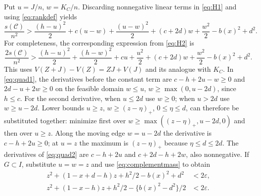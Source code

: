 \documentclass[10pt]{amsart}
\theoremstyle{remark}
\newcommand{\Cset}{\mathcal C}
\begin{document}
Put $u=J/n$, $w=K_C/n$. Discarding nonnegative linear terms in
\eqref{eq:H1} and using \eqref{eq:rankdef} yields
\begin{equation}\label{eq:quad1}
 \frac{s(\Cset)}{n^2}>
 \frac{(h-u)^2}{2}+c(u-w)+\frac{(u-w)^2}{2}
 +(c+2d)w+\frac{w^2}{2}-b(x)^2+d^2.
\end{equation}
For completeness, the corresponding expression from \eqref{eq:H2} is
\begin{equation}\label{eq:quad2}
 \frac{2s(\Cset)}{n^2}>
 \frac{(h-u)^2}{2}+\frac{(h-w)^2}{2}+cu+\frac{u^2}{2}
 +(c+2d)w+\frac{w^2}{2}-b(x)^2+d^2.
\end{equation}
This uses $V(Z+J)-V(Z)=ZJ+V(J)$ and its analogue with $K_C$.
In \eqref{eq:quad1}, the derivatives before the constant term are
$c-h+2u-w\ge0$ and $2d-u+2w\ge0$ on the feasible domain
$w\le u$, $w\ge\max(0,u-2d)$, since $h\le c$.
For the second derivative, when $u\le2d$ use $w\ge0$; when $u>2d$
use $w\ge u-2d$. Lower bounds $u\ge z$, $w\ge(z-\eta)_+$,
$0\le\eta\le d$, can therefore be substituted together: minimize
first over $w\ge\max((z-\eta)_+,u-2d,0)$ and then over $u\ge z$.
Along the moving edge $w=u-2d$ the derivative is $c-h+2u\ge0$;
at $u=z$ the maximum is $(z-\eta)_+$ because $\eta\le d\le2d$.
The derivatives of \eqref{eq:quad2} are $c-h+2u$ and
$c+2d-h+2w$, also nonnegative.
If $G\subset I$, substitute $u=w=z$ and use
\eqref{eq:complementmass} to obtain
\begin{align}
 z^2+(1-x+d-h)z+h^2/2-b(x)^2+d^2&<2\varepsilon,\label{eq:full1}\\
 z^2+(1-x-h)z+h^2/2-\{b(x)^2-d^2\}/2&<2\varepsilon.\label{eq:full2}
\end{align}
\end{document}
